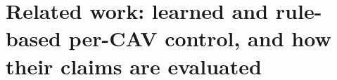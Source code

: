 \section{Related work: learned and rule-based per-CAV control, and how their claims are evaluated}\label{sec:related_work}

